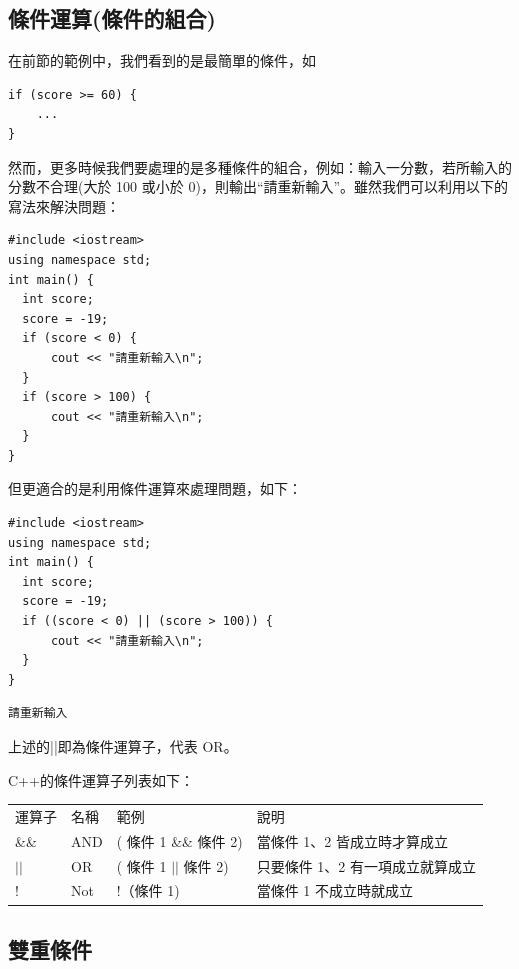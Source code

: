 \documentclass[12pt,a4paper]{article}
\begin{document}
\subsection{條件運算(條件的組合)}
\label{sec:orge3aee2e}
在前節的範例中，我們看到的是最簡單的條件，如
\lstset{breaklines=true,language=cpp,label= ,caption= ,captionpos=b,firstnumber=1,numbers=left}
\begin{lstlisting}
if (score >= 60) {
    ...
}
\end{lstlisting}
然而，更多時候我們要處理的是多種條件的組合，例如：輸入一分數，若所輸入的分數不合理(大於 100 或小於 0)，則輸出``請重新輸入''。雖然我們可以利用以下的寫法來解決問題：
\lstset{breaklines=true,language=cpp,label= ,caption= ,captionpos=b,firstnumber=1,numbers=left}
\begin{lstlisting}
#include <iostream>
using namespace std;
int main() {
  int score;
  score = -19;
  if (score < 0) {
      cout << "請重新輸入\n";
  }
  if (score > 100) {
      cout << "請重新輸入\n";
  }
}
\end{lstlisting}
但更適合的是利用條件運算來處理問題，如下：
\lstset{breaklines=true,language=cpp,label= ,caption= ,captionpos=b,firstnumber=1,numbers=left}
\begin{lstlisting}
#include <iostream>
using namespace std;
int main() {
  int score;
  score = -19;
  if ((score < 0) || (score > 100)) {
      cout << "請重新輸入\n";
  }
}
\end{lstlisting}

\begin{verbatim}
請重新輸入
\end{verbatim}


上述的||即為條件運算子，代表 OR。

C++的條件運算子列表如下：
\begin{center}
\begin{tabular}{llll}
運算子 & 名稱 & 範例 & 說明\\
\&\& & AND & ( 條件 1 \&\& 條件 2) & 當條件 1、2 皆成立時才算成立\\
\(\vert{} \vert{}\) & OR & ( 條件 1 \(\vert{} \vert{}\) 條件 2) & 只要條件 1、2 有一項成立就算成立\\
! & Not & !（條件 1) & 當條件 1 不成立時就成立\\
\end{tabular}
\end{center}

\subsection{雙重條件}
\label{sec:org6849257}
\end{document}
